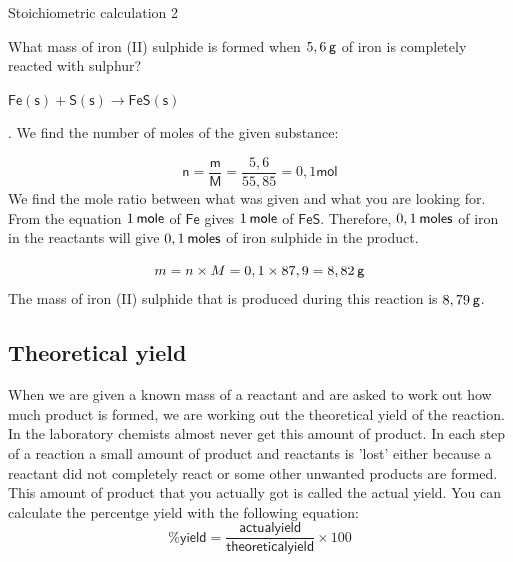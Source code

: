       \begin{wex}{Stoichiometric calculation 2 }
{
      \label{m38712*probfhsst!!!underscore!!!id1973}
      \label{m38712*id284347}What mass of iron (II) sulphide is formed when $5,6\phantom{\rule{2pt}{0ex}}\mathsf{g}$ of iron is completely reacted with sulphur?\par 
      \vspace{5pt} }
{
      \label{m38712*id284378}$\mathsf{Fe}\left(\mathsf{s}\right)+\mathsf{S}\left(\mathsf{s}\right)\to \mathsf{FeS}\left(\mathsf{s}\right)$
      \par 
      . We find the number of moles of the given substance:  
      \label{m38712*id284430}\nopagebreak\noindent{}
        
    \begin{equation*}
    \mathsf{n}=\frac{\mathsf{m}}{\mathsf{M}}=\frac{5,6}{55,85}=0,1\mathsf{mol}
      \end{equation*}
       We find the mole ratio between what was given and what you are looking for. From the equation $1\phantom{\rule{2pt}{0ex}}\mathsf{mole}$ of $\mathsf{Fe}$ gives $1\phantom{\rule{2pt}{0ex}}\mathsf{mole}$ of $\mathsf{FeS}$. Therefore, $0,1\phantom{\rule{2pt}{0ex}}\mathsf{moles}$ of iron in the reactants will give $0,1\phantom{\rule{2pt}{0ex}}\mathsf{moles}$ of iron sulphide in the product.\par 
      \label{m38712*id284499}\nopagebreak\noindent{}
    \begin{equation*}
    m=n\ensuremath{\times}M=0,1\ensuremath{\times}87,9=8,82\phantom{\rule{2pt}{0ex}}\mathsf{g}
      \end{equation*}
      \label{m38712*id284548}The mass of iron (II) sulphide that is produced during this reaction is $8,79\phantom{\rule{2pt}{0ex}}\mathsf{g}$. \par 
}
    \end{wex}
    \noindent
\subsection*{Theoretical yield}
\label{m38712*eip-943}When we are given a known mass of a reactant and are asked to work out how much product is formed, we are working out the theoretical yield of the reaction. In the laboratory chemists almost never get this amount of product. In each step of a reaction a small amount of product and reactants is 'lost' either because a reactant did not completely react or some other unwanted products are formed. This amount of product that you actually got is called the actual yield. You can calculate the percentge yield with the following equation:
\begin{equation*}
 \mathsf{\% yield} = \frac{\mathsf{actual yield}}{\mathsf{theoretical yield}} \times 100
\end{equation*}

